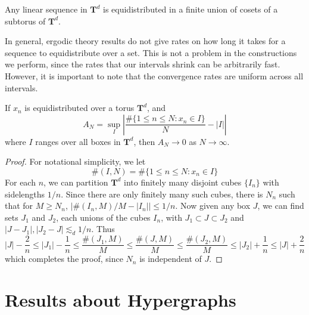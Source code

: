 \begin{corollary}
    Any linear sequence in $\mathbf{T}^d$ is equidistributed in a finite union of cosets of a subtorus of $\mathbf{T}^d$.
\end{corollary}

In general, ergodic theory results do not give rates on how long it takes for a sequence to equidistribute over a set. This is not a problem in the constructions we perform, since the rates that our intervals shrink can be arbitrarily fast. However, it is important to note that the convergence rates are uniform across all intervals.

\begin{theorem}
    If $x_n$ is equidistributed over a torus $\mathbf{T}^d$, and
    \[ A_N = \sup_I \left| \frac{\# \{ 1 \leq n \leq N : x_n \in I \}}{N} - |I| \right| \]
    where $I$ ranges over all boxes in $\mathbf{T}^d$, then $A_N \to 0$ as $N \to \infty$.
\end{theorem}
\begin{proof}
    For notational simplicity, we let
    \[ \# (I,N) = \# \{ 1 \leq n \leq N: x_n \in I \} \]
    For each $n$, we can partition $\mathbf{T}^d$ into finitely many disjoint cubes $\{ I_n \}$ with sidelengths $1/n$. Since there are only finitely many such cubes, there is $N_n$ such that for $M \geq N_n$, $| \#(I_n,M)/M - |I_n|| \leq 1/n$. Now given any box $J$, we can find sets $J_1$ and $J_2$, each unions of the cubes $I_n$, with $J_1 \subset J \subset J_2$ and $|J - J_1|, |J_2 - J| \lesssim_d 1/n$. Thus
    \[ |J| - \frac{2}{n} \leq |J_1| - \frac{1}{n} \leq \frac{\#(J_1,M)}{M} \leq \frac{\#(J,M)}{M} \leq \frac{\#(J_2,M)}{M} \leq |J_2| + \frac{1}{n} \leq |J| + \frac{2}{n} \]
    which completes the proof, since $N_n$ is independent of $J$.
\end{proof}








\section{Results about Hypergraphs}

